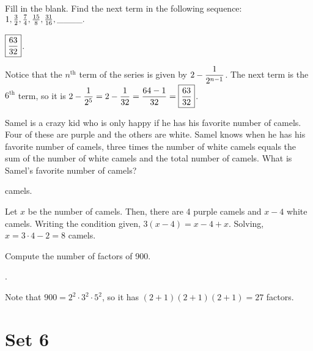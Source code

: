 \documentclass[11pt]{article}
\DeclareRobustCommand{\frac}[3][0pt]{%
  {\begingroup\hspace{#1}#2\hspace{#1}\endgroup\over\hspace{#1}#3\hspace{#1}}}
\begin{document}
\begin{problem}Fill in the blank. Find the next term in the following sequence: $1, \frac{3}{2}, \frac{7}{4}, \frac{15}{8}, \frac{31}{16}, \_\_\_\_.$
\end{problem}

\begin{answer} $\boxed{\displaystyle \frac{63}{32}}$. \end{answer}
\begin{solution}
Notice that the $n^{\text{th}}$ term of the series is given by $\displaystyle 2 - \frac{1}{2^{n-1}}$. The next term is the $6^{\text{th}}$ term, so it is $\displaystyle 2 - \frac{1}{2^{5}} = 2 - \frac{1}{32} = \frac{64 - 1}{32} = \boxed{\frac{63}{32}}$.
\end{solution}

\begin{problem} Samel is a crazy kid who is only happy if he has his favorite number of camels. Four of these are purple and the others are white. Samel knows when he has his favorite number of camels, three times the number of white camels equals the sum of the number of white camels and the total number of camels. What is Samel's favorite number of camels?
\end{problem}

\begin{answer}  camels. \end{answer}
\begin{solution}
Let $x$ be the number of camels. Then, there are 4 purple camels and $x - 4$ white camels. Writing the condition given, $3(x - 4) = x - 4 + x$. Solving, $x = 3 \cdot 4 - 2 = \boxed{8}$ camels.
\end{solution}

\begin{problem} Compute the number of factors of 900.
\end{problem}

\begin{answer} . \end{answer}
\begin{solution}
Note that $900 = 2^2 \cdot 3^2 \cdot 5^2$, so it has $(2 + 1)(2 + 1)(2 + 1) = \boxed{27}$ factors.
\end{solution}

\eject

\section*{Set 6}
\end{document}
